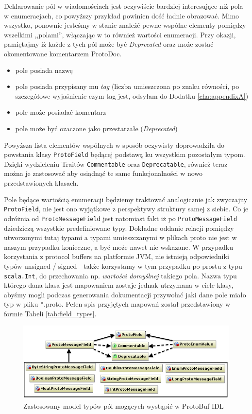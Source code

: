 \documentclass[pdflatex,11pt]{aghdpl}
\begin{document}
Deklarowanie pól w wiadomościach jest oczywiście bardziej interesujące niż pola w enumeracjach, co powyższy przykład powinien dość ładnie obrazować.
Mimo wszystko, ponownie jesteśmy w stanie znaleźć pewne wspólne elementy pomiędzy wszelkimi ,,polami'', włączając w to również wartości enumeracji.
Przy okazji, pamiętajmy iż każde  z tych pól może być \textit{Deprecated} oraz może zostać okomentowane komentarzem ProtoDoc.

\begin{itemize}
 \item pole posiada nazwę
 \item pole posiada przypisany mu \textit{tag} (liczba umieszczona po znaku równości, po szczegółowe wyjaśnienie czym tag jest, odsyłam do Dodatku \ref{cha:appendixA})
 \item pole może posiadać komentarz
 \item pole może być ozaczone jako przestarzałe (\textit{Deprecated})
\end{itemize}

Powyższa lista elementów wspólnych w sposób oczywisty doprowadziła do powstania klasy \verb|ProtoField| będącej podstawą ku wszystkim pozostałym typom.
Dzięki wydzieleniu Traitów \verb|Commentable| oraz \verb|Deprecatable|, również teraz można je zastosować aby osiądnąć te same funkcjonalności w nowo przedstawionych klasach.

Pole będące wartością enumeracji będziemy traktować analogicznie jak zwyczajny \verb|ProtoField|, nie jest ono wyjątkowe z perspektywy struktury samej z siebie.
Co je odróżnia od \verb|ProtoMessageField| jest natomiast fakt iż po \verb|ProtoMessageField| dziedziczą wszystkie predefiniowane typy.
Dokładne oddanie relacji pomiędzy utworzonymi tutaj typami a typami umieszczanymi w plikach proto nie jest w naszym przypadku konieczne, a być może nawet nie wskazane.
W przypadku korzystania z protocol buffers na platformie JVM, nie istnieją odpowiedniki typów unsigned / signed - także korzystamy w tym przypadku po prostu z 
typu \verb|scala.Int|, do przechowania np. \textit{wartości domyślnej} takiego pola. Nazwa typu którego dana klasa jest mapowaniem zostaje jednak utrzymana w ciele klasy,
abyśmy mogli podczas generowania dokumentacji przywołać jaki dane pole miało typ w pliku *.proto. Pełen spis przyjętych mapowań został przedstawiony w formie Tabeli \ref{tab:field_types}. 

\begin{figure}[ch]
\begin{center}
 \includegraphics[width=\textwidth]{fields_types}
\end{center}
\label{types_diagram}
\caption{Zastosowany model typów pól mogących wystąpić w ProtoBuf IDL}
\end{figure}
\end{document}

